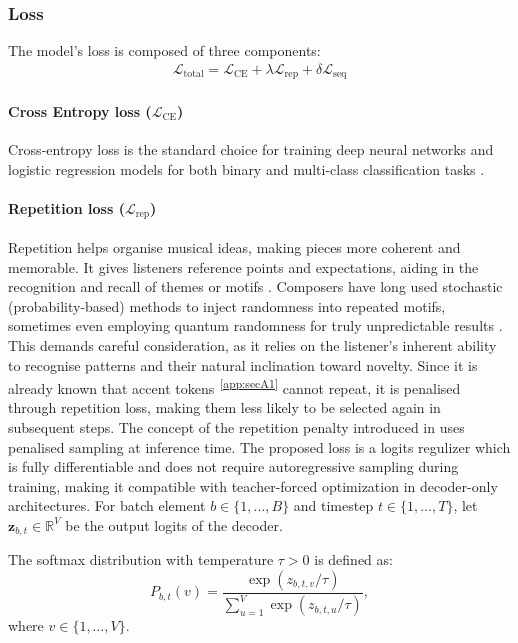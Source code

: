 \documentclass{article} %
\begin{document}
\subsubsection{Loss}
The model's loss is composed of three components:
\begin{align}
\mathcal{L}_{\text{total}} = \mathcal{L}_{\text{CE}} + \lambda \mathcal{L}_{\text{rep}} + \delta \mathcal{L}_{\text{seq}}
\end{align}
\paragraph{Cross Entropy loss ($\mathcal{L}_{\text{CE}}$)}
Cross-entropy loss is the standard choice for training deep neural 
networks and logistic regression models for both binary and multi-class 
classification tasks \citep{mlglossary}.


\paragraph{Repetition loss ($\mathcal{L}_{\text{rep}}$)} 
Repetition helps organise musical ideas, making pieces more 
coherent and memorable. It gives listeners reference points and expectations, 
aiding in the recognition and recall of themes or motifs \citep{Hu_2022}.
Composers have long used stochastic (probability-based) methods to inject randomness into repeated motifs, 
sometimes even employing quantum randomness for truly unpredictable results \citep{yamada_grandi_munoz-gil_barbiero_aloy_lewenstein_2021}. 
This demands careful consideration, as it relies on the listener's inherent 
ability to recognise patterns and their natural inclination toward novelty. 
Since it is already known that accent tokens\textsuperscript{~\ref{app:secA1}}
cannot repeat, it is penalised through repetition loss, making them less likely to 
be selected again in subsequent steps. 
The concept of the repetition penalty introduced in \citet{reppenalty} uses penalised sampling
at inference time.
The proposed loss is a logits regulizer which is fully differentiable 
and does not require autoregressive sampling
during training, making it compatible with teacher-forced optimization in
decoder-only architectures.
For batch element $b \in \{1,\dots,B\}$ and timestep $t \in \{1,\dots,T\}$, let
$\mathbf{z}_{b,t} \in \mathbb{R}^{V}$ be the output logits of the decoder.

The softmax distribution with temperature $\tau > 0$ is defined as:
\begin{equation}
P_{b,t}(v)
=
\frac{\exp(z_{b,t,v} / \tau)}
{\sum_{u=1}^{V} \exp(z_{b,t,u} / \tau)} ,
\end{equation}
where $v \in \{1,\dots,V\}$.
\end{document}
